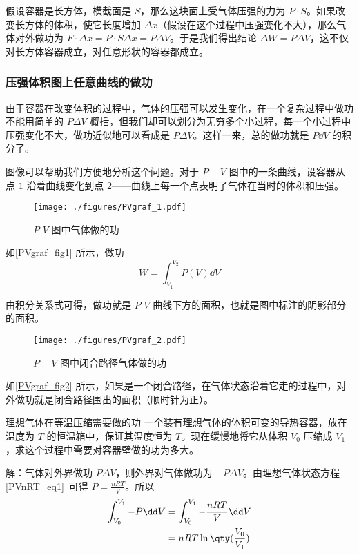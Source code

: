 假设容器是长方体，横截面是 $S$，那么这块面上受气体压强的力为 $P\cdot S$。如果改变长方体的体积，使它长度增加 $\Delta x$（假设在这个过程中压强变化不大），那么气体对外做功为 $F\cdot \Delta x=P\cdot S\Delta x=P\Delta V$。于是我们得出结论 $\Delta W=P\Delta V$，这不仅对长方体容器成立，对任意形状的容器都成立。
\subsubsection{压强体积图上任意曲线的做功}
由于容器在改变体积的过程中，气体的压强可以发生变化，在一个复杂过程中做功不能用简单的 $P\Delta V$ 概括，但我们却可以划分为无穷多个小过程，每一个小过程中压强变化不大，做功近似地可以看成是 $P\Delta V$。这样一来，总的做功就是 $P\dd V$ 的积分了。

图像可以帮助我们方便地分析这个问题。对于 $P-V$ 图中的一条曲线，设容器从点 $1$ 沿着曲线变化到点 $2$——曲线上每一个点表明了气体在当时的体积和压强。
\begin{figure}[ht]
\centering
\texttt{[image: ./figures/PVgraf\_1.pdf]}
\caption{$P$-$V$ 图中气体做的功} \label{PVgraf_fig1}
\end{figure}

如\autoref{PVgraf_fig1} 所示，做功
\begin{equation}\label{PVgraf_eq1}
W = \int_{V_1}^{V_2}P(V) \dd{V}
\end{equation}

由积分关系式可得，做功就是 $P$-$V$ 曲线下方的面积，也就是图中标注的阴影部分的面积。 

\begin{figure}[ht]  
\centering
\texttt{[image: ./figures/PVgraf\_2.pdf]}
\caption{$P-V$ 图中闭合路径气体做的功} \label{PVgraf_fig2}
\end{figure}

如\autoref{PVgraf_fig2} 所示，如果是一个闭合路径，在气体状态沿着它走的过程中，对外做功就是闭合路径围出的面积（顺时针为正）。

\begin{example}{理想气体在等温压缩需要做的功}
一个装有理想气体的体积可变的导热容器，放在温度为 $T$ 的恒温箱中，保证其温度恒为 $T$。现在缓慢地将它从体积 $V_0$ 压缩成 $V_1$，求这个过程中需要对容器壁做的功为多大。

解：气体对外界做功 $P\Delta V$，则外界对气体做功为 $-P\Delta V$。由理想气体状态方程\autoref{PVnRT_eq1}~可得 $P=\frac{nRT}{V}$。所以
\begin{equation}
\begin{aligned}
\int_{V_0}^{V_1} -P\dd V&=\int_{V_0}^{V_1} -\frac{nRT}{V} \dd V \\
&=nRT \ln\qty(\frac{V_0}{V_1})
\end{aligned}
\end{equation}
\end{example}
